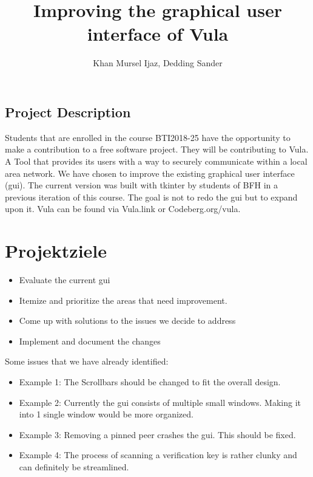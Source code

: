 \documentclass[
    type=projectproposal,
    twocolumn
]{bfhpub}
\begin{document}
\title{Improving the graphical user interface of Vula}
\subject{Making secure communication more accessible by improving the user experience.}
\author{Khan Mursel Ijaz, Dedding Sander}

\begin{ProjectDescription}
    \section{Project Description}
    Students that are enrolled in the course BTI2018-25 have the opportunity to make a contribution to a free software project. They will be contributing to Vula. A Tool that provides its users with a way to securely communicate within a local area network. We have chosen to improve the existing graphical user interface (gui). The current version was built with tkinter by students of BFH in a previous iteration of this course. The goal is not to redo the gui but to expand upon it. Vula can be found via Vula.link or Codeberg.org/vula.
\end{ProjectDescription}

\maketitle

\section{Projektziele}
\begin{itemize}
    \item Evaluate the current gui
    \item Itemize and prioritize the areas that need improvement.
    \item Come up with solutions to the issues we decide to address
    \item Implement and document the changes
\end{itemize}

Some issues that we have already identified:
\begin{itemize}
    \item Example 1: The Scrollbars should be changed to fit the overall design.
    \item Example 2: Currently the gui consists of multiple small windows. Making it into 1 single window would be more organized.
    \item Example 3: Removing a pinned peer crashes the gui. This should be fixed.
    \item Example 4: The process of scanning a verification key is rather clunky and can definitely be streamlined.
\end{itemize}
\end{document}
